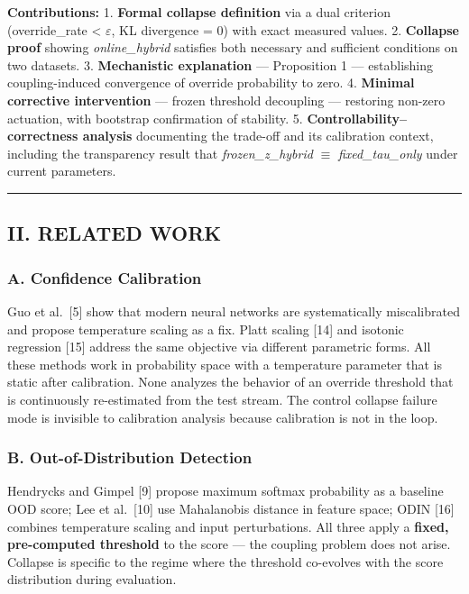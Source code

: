 \documentclass[
  conference]{IEEEtran}
\begin{document}
\textbf{Contributions:} 1. \textbf{Formal collapse definition} via a
dual criterion (override\_rate \textless{} \(\varepsilon\), KL
divergence = 0) with exact measured values. 2. \textbf{Collapse proof}
showing \emph{online\_hybrid} satisfies both necessary and sufficient
conditions on two datasets. 3. \textbf{Mechanistic explanation} ---
Proposition 1 --- establishing coupling-induced convergence of override
probability to zero. 4. \textbf{Minimal corrective intervention} ---
frozen threshold decoupling --- restoring non-zero actuation, with
bootstrap confirmation of stability. 5.
\textbf{Controllability--correctness analysis} documenting the trade-off
and its calibration context, including the transparency result that
\emph{frozen\_z\_hybrid} \(\equiv\) \emph{fixed\_tau\_only} under
current parameters.

\begin{center}\rule{0.5\linewidth}{0.5pt}\end{center}

\subsection{II. RELATED WORK}\label{ii.-related-work}

\subsubsection{A. Confidence
Calibration}\label{a.-confidence-calibration}

Guo et al.~{[}5{]} show that modern neural networks are systematically
miscalibrated and propose temperature scaling as a fix. Platt scaling
{[}14{]} and isotonic regression {[}15{]} address the same objective via
different parametric forms. All these methods work in probability space
with a temperature parameter that is static after calibration. None
analyzes the behavior of an override threshold that is continuously
re-estimated from the test stream. The control collapse failure mode is
invisible to calibration analysis because calibration is not in the
loop.

\subsubsection{B. Out-of-Distribution
Detection}\label{b.-out-of-distribution-detection}

Hendrycks and Gimpel {[}9{]} propose maximum softmax probability as a
baseline OOD score; Lee et al.~{[}10{]} use Mahalanobis distance in
feature space; ODIN {[}16{]} combines temperature scaling and input
perturbations. All three apply a \textbf{fixed, pre-computed threshold}
to the score --- the coupling problem does not arise. Collapse is
specific to the regime where the threshold co-evolves with the score
distribution during evaluation.
\end{document}
